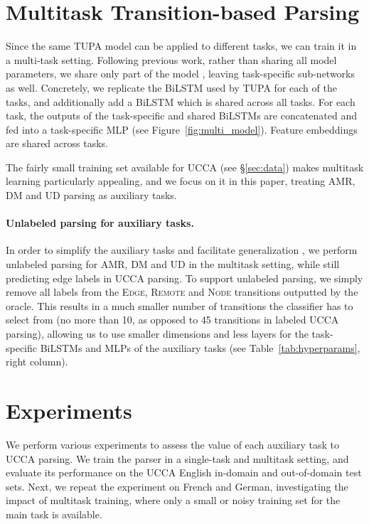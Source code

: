 \documentclass[11pt,a4paper]{article}
\begin{document}
\section{Multitask Transition-based Parsing}\label{sec:multitask}

Since the same TUPA model can be applied to different tasks, 
we can train it in a multi-task setting.
Following previous work, rather than sharing all model parameters, we share only part of the model
\cite{N16-1179,P16-2038,C16-1013,C16-1059,C16-1179,E17-1005,P17-1186}, leaving task-specific
sub-networks as well.
Concretely, we replicate the BiLSTM used by TUPA for each of the tasks, and additionally add
a BiLSTM which is shared across all tasks. 
For each task, the outputs of the task-specific and shared BiLSTMs are concatenated and
fed into a task-specific MLP (see Figure~\ref{fig:multi_model}).
Feature embeddings are shared across tasks.

The fairly small training set available for UCCA (see \S\ref{sec:data})
makes multitask learning particularly appealing,
and we focus on it in this paper, treating AMR, DM and UD parsing as auxiliary tasks.

\paragraph{Unlabeled parsing for auxiliary tasks.}
In order to simplify the auxiliary tasks and facilitate generalization \cite{E17-2026},
we perform unlabeled parsing for AMR, DM and UD in the multitask setting,
while still predicting edge labels in UCCA parsing.
To support unlabeled parsing, we simply remove all labels from the
\textsc{Edge}, \textsc{Remote} and \textsc{Node} transitions outputted by the oracle.
This results in a much smaller number of transitions the classifier has to select from
(no more than 10, as opposed to 45 transitions in labeled UCCA parsing),
allowing us to use smaller dimensions and less layers for the task-specific BiLSTMs and MLPs
of the auxiliary tasks (see Table~\ref{tab:hyperparams}, right column).



\section{Experiments}\label{sec:experiments}

We perform various experiments to assess the value of each auxiliary task to UCCA parsing.
We train the parser in a single-task and multitask setting,
and evaluate its performance on the UCCA English in-domain and out-of-domain test sets.
Next, we repeat the experiment on French and German, investigating the impact of multitask
training, where only a small or noisy training set for the main task is available.
\end{document}
